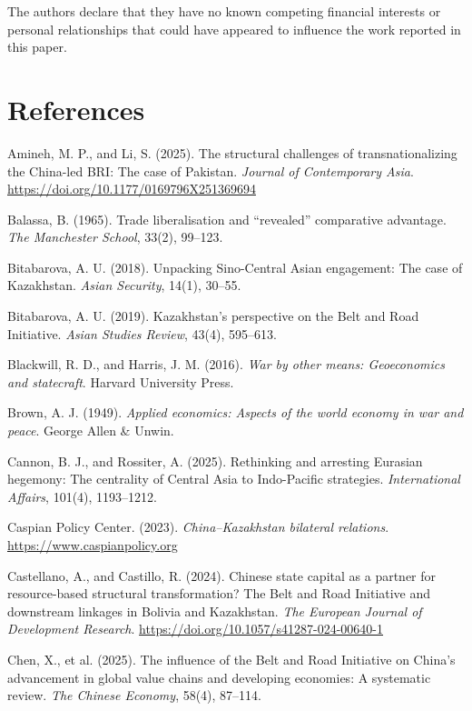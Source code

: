 \documentclass[12pt]{article}
\begin{document}
The authors declare that they have no known competing financial interests or personal relationships that could have appeared to influence the work reported in this paper.

\newpage
\section*{References}

\noindent Amineh, M. P., and Li, S. (2025). The structural challenges of transnationalizing the China-led BRI: The case of Pakistan. \textit{Journal of Contemporary Asia}. \url{https://doi.org/10.1177/0169796X251369694}

\noindent Balassa, B. (1965). Trade liberalisation and ``revealed'' comparative advantage. \textit{The Manchester School}, 33(2), 99--123.

\noindent Bitabarova, A. U. (2018). Unpacking Sino-Central Asian engagement: The case of Kazakhstan. \textit{Asian Security}, 14(1), 30--55.

\noindent Bitabarova, A. U. (2019). Kazakhstan's perspective on the Belt and Road Initiative. \textit{Asian Studies Review}, 43(4), 595--613.

\noindent Blackwill, R. D., and Harris, J. M. (2016). \textit{War by other means: Geoeconomics and statecraft}. Harvard University Press.

\noindent Brown, A. J. (1949). \textit{Applied economics: Aspects of the world economy in war and peace}. George Allen \& Unwin.

\noindent Cannon, B. J., and Rossiter, A. (2025). Rethinking and arresting Eurasian hegemony: The centrality of Central Asia to Indo-Pacific strategies. \textit{International Affairs}, 101(4), 1193--1212.

\noindent Caspian Policy Center. (2023). \textit{China--Kazakhstan bilateral relations}. \url{https://www.caspianpolicy.org}

\noindent Castellano, A., and Castillo, R. (2024). Chinese state capital as a partner for resource-based structural transformation? The Belt and Road Initiative and downstream linkages in Bolivia and Kazakhstan. \textit{The European Journal of Development Research}. \url{https://doi.org/10.1057/s41287-024-00640-1}

\noindent Chen, X., et al. (2025). The influence of the Belt and Road Initiative on China's advancement in global value chains and developing economies: A systematic review. \textit{The Chinese Economy}, 58(4), 87--114.
\end{document}
